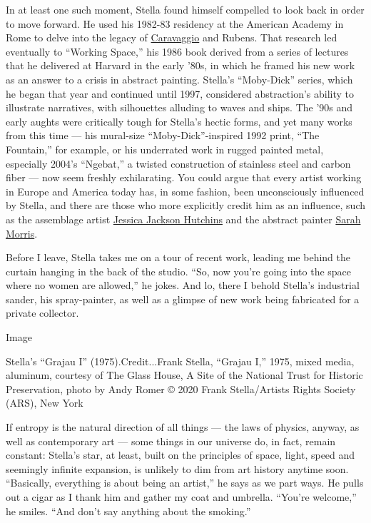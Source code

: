 In at least one such moment, Stella found himself compelled to look back
in order to move forward. He used his 1982-83 residency at the American
Academy in Rome to delve into the legacy of
\href{https://www.nytimes3xbfgragh.onion/topic/person/caravaggio}{Caravaggio}
and Rubens. That research led eventually to ``Working Space,'' his 1986
book derived from a series of lectures that he delivered at Harvard in
the early '80s, in which he framed his new work as an answer to a crisis
in abstract painting. Stella's ``Moby-Dick'' series, which he began that
year and continued until 1997, considered abstraction's ability to
illustrate narratives, with silhouettes alluding to waves and ships. The
'90s and early aughts were critically tough for Stella's hectic forms,
and yet many works from this time --- his mural-size
``Moby-Dick''-inspired 1992 print, ``The Fountain,'' for example, or his
underrated work in rugged painted metal, especially 2004's ``Ngebat,'' a
twisted construction of stainless steel and carbon fiber --- now seem
freshly exhilarating. You could argue that every artist working in
Europe and America today has, in some fashion, been unconsciously
influenced by Stella, and there are those who more explicitly credit him
as an influence, such as the assemblage artist
\href{https://www.marianneboeskygallery.com/artists/jessica-jackson-hutchins/bio}{Jessica
Jackson Hutchins} and the abstract painter
\href{https://www.petzel.com/artists/sarah-morris}{Sarah Morris}.

Before I leave, Stella takes me on a tour of recent work, leading me
behind the curtain hanging in the back of the studio. ``So, now you're
going into the space where no women are allowed,'' he jokes. And lo,
there I behold Stella's industrial sander, his spray-painter, as well as
a glimpse of new work being fabricated for a private collector.

Image

Stella's ``Grajau I'' (1975).Credit...Frank Stella, ``Grajau I,'' 1975,
mixed media, aluminum, courtesy of The Glass House, A Site of the
National Trust for Historic Preservation, photo by Andy Romer © 2020
Frank Stella/Artists Rights Society (ARS), New York

If entropy is the natural direction of all things --- the laws of
physics, anyway, as well as contemporary art --- some things in our
universe do, in fact, remain constant: Stella's star, at least, built on
the principles of space, light, speed and seemingly infinite expansion,
is unlikely to dim from art history anytime soon. ``Basically,
everything is about being an artist,'' he says as we part ways. He pulls
out a cigar as I thank him and gather my coat and umbrella. ``You're
welcome,'' he smiles. ``And don't say anything about the smoking.''

